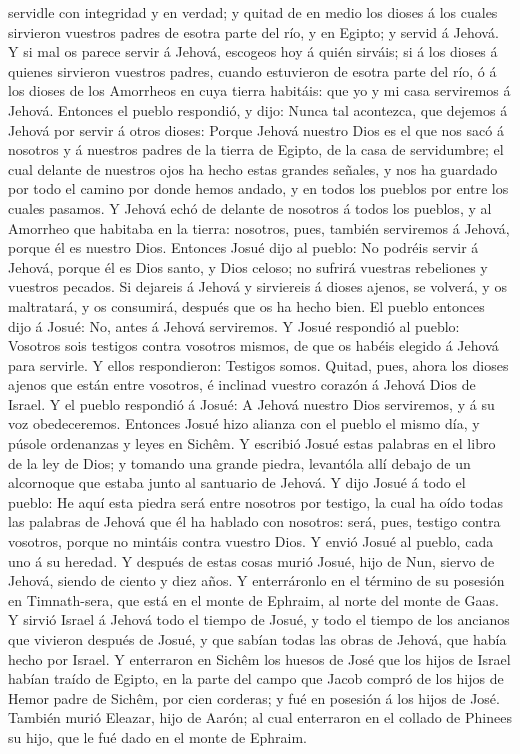 servidle con integridad y en verdad; y quitad de en medio los dioses á
los cuales sirvieron vuestros padres de esotra parte del río, y en
Egipto; y servid á Jehová.  Y si mal os parece servir á
Jehová, escogeos hoy á quién sirváis; si á los dioses á quienes
sirvieron vuestros padres, cuando estuvieron de esotra parte del río, ó
á los dioses de los Amorrheos en cuya tierra habitáis: que yo y mi casa
serviremos á Jehová.  Entonces el pueblo respondió, y
dijo: Nunca tal acontezca, que dejemos á Jehová por servir á otros
dioses:  Porque Jehová nuestro Dios es el que nos sacó á
nosotros y á nuestros padres de la tierra de Egipto, de la casa de
servidumbre; el cual delante de nuestros ojos ha hecho estas grandes
señales, y nos ha guardado por todo el camino por donde hemos andado, y
en todos los pueblos por entre los cuales pasamos.  Y
Jehová echó de delante de nosotros á todos los pueblos, y al Amorrheo
que habitaba en la tierra: nosotros, pues, también serviremos á Jehová,
porque él es nuestro Dios.  Entonces Josué dijo al
pueblo: No podréis servir á Jehová, porque él es Dios santo, y Dios
celoso; no sufrirá vuestras rebeliones y vuestros pecados.
 Si dejareis á Jehová y sirviereis á dioses ajenos, se
volverá, y os maltratará, y os consumirá, después que os ha hecho bien.
 El pueblo entonces dijo á Josué: No, antes á Jehová
serviremos.  Y Josué respondió al pueblo: Vosotros sois
testigos contra vosotros mismos, de que os habéis elegido á Jehová para
servirle. Y ellos respondieron: Testigos somos.  Quitad,
pues, ahora los dioses ajenos que están entre vosotros, é inclinad
vuestro corazón á Jehová Dios de Israel.  Y el pueblo
respondió á Josué: A Jehová nuestro Dios serviremos, y á su voz
obedeceremos.  Entonces Josué hizo alianza con el pueblo
el mismo día, y púsole ordenanzas y leyes en Sichêm.  Y
escribió Josué estas palabras en el libro de la ley de Dios; y tomando
una grande piedra, levantóla allí debajo de un alcornoque que estaba
junto al santuario de Jehová.  Y dijo Josué á todo el
pueblo: He aquí esta piedra será entre nosotros por testigo, la cual ha
oído todas las palabras de Jehová que él ha hablado con nosotros: será,
pues, testigo contra vosotros, porque no mintáis contra vuestro Dios.
 Y envió Josué al pueblo, cada uno á su heredad.
 Y después de estas cosas murió Josué, hijo de Nun,
siervo de Jehová, siendo de ciento y diez años.  Y
enterráronlo en el término de su posesión en Timnath-sera, que está en
el monte de Ephraim, al norte del monte de Gaas.  Y
sirvió Israel á Jehová todo el tiempo de Josué, y todo el tiempo de los
ancianos que vivieron después de Josué, y que sabían todas las obras de
Jehová, que había hecho por Israel.  Y enterraron en
Sichêm los huesos de José que los hijos de Israel habían traído de
Egipto, en la parte del campo que Jacob compró de los hijos de Hemor
padre de Sichêm, por cien corderas; y fué en posesión á los hijos de
José.  También murió Eleazar, hijo de Aarón; al cual
enterraron en el collado de Phinees su hijo, que le fué dado en el monte
de Ephraim.
